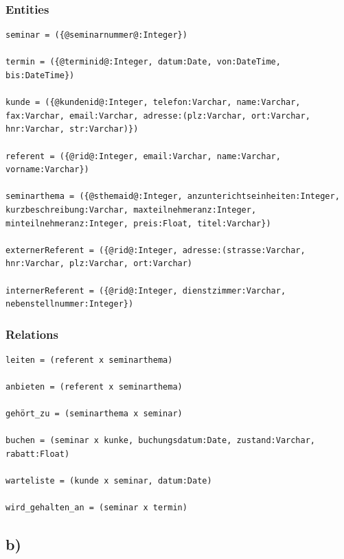 \documentclass[10pt,a4paper]{article}
\begin{document}
\subsubsection{Entities}
\begin{lstlisting}[]
seminar = ({@seminarnummer@:Integer})

termin = ({@terminid@:Integer, datum:Date, von:DateTime, bis:DateTime})

kunde = ({@kundenid@:Integer, telefon:Varchar, name:Varchar, fax:Varchar, email:Varchar, adresse:(plz:Varchar, ort:Varchar, hnr:Varchar, str:Varchar)})  

referent = ({@rid@:Integer, email:Varchar, name:Varchar, vorname:Varchar})

seminarthema = ({@sthemaid@:Integer, anzunterichtseinheiten:Integer, kurzbeschreibung:Varchar, maxteilnehmeranz:Integer, minteilnehmeranz:Integer, preis:Float, titel:Varchar})

externerReferent = ({@rid@:Integer, adresse:(strasse:Varchar, hnr:Varchar, plz:Varchar, ort:Varchar)

internerReferent = ({@rid@:Integer, dienstzimmer:Varchar, nebenstellnummer:Integer})
\end{lstlisting}

\subsubsection{Relations}
\begin{lstlisting}[]
leiten = (referent x seminarthema)

anbieten = (referent x seminarthema)

gehört_zu = (seminarthema x seminar)

buchen = (seminar x kunke, buchungsdatum:Date, zustand:Varchar, rabatt:Float)

warteliste = (kunde x seminar, datum:Date)

wird_gehalten_an = (seminar x termin)
\end{lstlisting}

\newpage
\subsection{b)}
\end{document}
